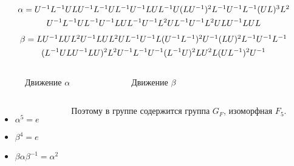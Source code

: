\documentclass[utf8,russian]{beamer}
\begin{document}
\begin{frame}
\begin{multline*} %
$$
\alpha=U^{-1}L^{-1}ULU^{-1}L^{-1}UL^{-1}U^{-1}LUL^{-1}U(LU^{-1})^2L^{-1}U^{-1}L^{-1}(UL)^3L^2 \\
U^{-1}L^{-1}UL^{-1}U^{-1}LUL^{-1}U^{-1}L^2UL^{-1}U^{-1}L^2ULU^{-1}LUL
$$
\end{multline*}
\begin{multline*} %
$$
\beta=LU^{-1}LUL^2U^{-1}LUL^2UL^{-1}U^{-1}L(U^{-1}L^{-1})^2U^{-1}(LU)^2L^{-1}U^{-1}L^{-1}\\ 
(L^{-1}ULU^{-1}LU)^2L^2U^{-1}L^{-1}U^{-1}(L^{-1}U)^2LU^2L(UL^{-1})^2U^{-1}
$$
\end{multline*}
\begin{columns}
	\RubikCubeSolved
	\vspace*{-1cm}
	\begin{figure}[c]
		\caption{Движение $\alpha$}
	\end{figure}
	\RubikCubeSolved
	\vspace*{-1cm}
	\begin{figure}[c]
		\caption{Движение $\beta$}
	\end{figure}
\end{columns}
\begin{columns}
\begin{itemize}
\item $\alpha^5=e$
\item $\beta^4=e$
\item $\beta\alpha\beta^{-1}=\alpha^2$
\end{itemize}
Поэтому в группе содержится группа $G_{F}$, изоморфная $F_5$.
\end{columns}
\end{frame}

\end{document}
